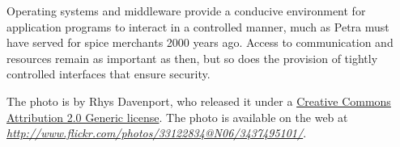 \documentclass[10pt]{book}
\begin{document}
Operating systems and middleware provide a conducive environment for application programs to interact in a controlled manner, much as Petra must have served for spice merchants 2000 years ago. Access to communication and resources remain as important as then, but so does the provision of tightly controlled interfaces that ensure security.

The photo is by Rhys Davenport, who released it under a \href{http://creativecommons.org/licenses/by/2.0/deed.en}{Creative Commons Attribution 2.0 Generic license}. The photo is available on the web at \textit{\url{http://www.flickr.com/photos/33122834@N06/3437495101/}}.
\fi

\tableofcontents

\makeatletter
\let\@oldmakeschapterhead\@makeschapterhead
\def\@makeschapterhead#1{\addcontentsline{toc}{chapter}{#1}%
  \@oldmakeschapterhead{#1}}
\renewcommand\thechapterenumi{\thechapter.\@arabic\c@chapterenumi}
\newcommand\labelchapterenumi{\thechapterenumi}
\def\chapterEnumerate{%
  \ifnum \@enumdepth >0\@toodeep\else
    \advance\@enumdepth\@ne
    \edef\@enumctr{chapterenum\romannumeral\the\@enumdepth}%
      \expandafter
      \list
        \csname label\@enumctr\endcsname
        {\usecounter\@enumctr\def\makelabel##1{\hss\llap{##1}}}%
  \fi}
\let\endchapterEnumerate =\endlist
\makeatother

%

\mainmatter





%







%

\backmatter
%
\printindex
\end{document}
